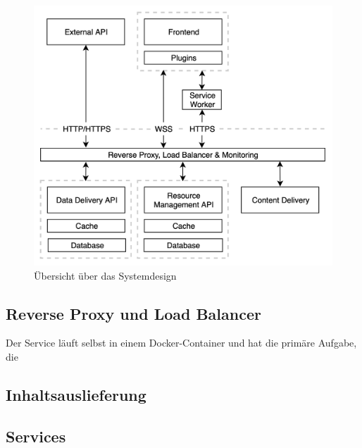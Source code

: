 \begin{figure}
    \begin{center}
    \includegraphics[scale=0.2]{img/abbildungen/MicroserviceInfrastruktur}
    \end{center}
    \caption{Übersicht über das Systemdesign}
    \label{figure:uebersichtueberdassystemdesign}
\end{figure}

\subsection{Reverse Proxy und Load Balancer}
\label{subsec:reverseproxyundloadbalancer}

Der Service läuft selbst in einem
Docker-Container und hat die primäre Aufgabe, die 

\subsection{Inhaltsauslieferung}
\label{subsec:inhaltsauslieferung}


\subsection{Services}
\label{subsec:services}

